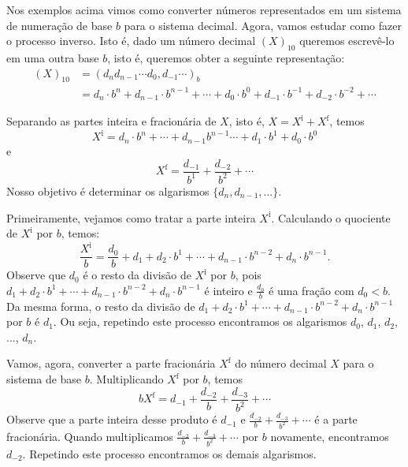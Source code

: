 Nos exemplos acima vimos como converter números representados em um sistema de numeração de base $b$ para o sistema decimal. Agora, vamos estudar como fazer o processo inverso. Isto é, dado um número decimal $(X)_{10}$ queremos escrevê-lo em uma outra base $b$, isto é, queremos obter a seguinte representação:
\begin{equation}
  \begin{split}
    (X)_{10} &= (d_nd_{n-1}\cdots d_0,d_{-1}\cdots)_{b} \\
    &= d_n\cdot b^{n}+d_{n-1}\cdot b^{n-1}+\cdots + d_0\cdot b^0+d_{-1}\cdot b^{-1}+d_{-2}\cdot b^{-2}+\cdots
  \end{split}
\end{equation}

Separando as partes inteira e fracionária de $X$, isto é, $X = X^{\mbox{i}} + X^{\mbox{f}}$, temos
\begin{equation}
X^{\mbox{i}} = d_n\cdot b^{n}+ \cdots+d_{n-1}b^{n-1} \cdots  +d_1\cdot b^1 +d_0\cdot b^0
\end{equation}
e
\begin{equation}
  X^{\mbox{f}} = \frac{d_{-1}}{b^1} + \frac{d_{-2}}{b^{2}} + \cdots
\end{equation}
Nosso objetivo é determinar os algarismos $\{d_n, d_{n-1}, ...\}$.

Primeiramente, vejamos como tratar a parte inteira $X^{\mbox{i}}$. Calculando o quociente de $X^{\mbox{i}}$ por $b$, temos:
\begin{equation}
  \frac{X^{\mbox{i}}}{b}=   \frac{d_0}{b}+d_1+d_2\cdot b^1+\cdots+d_{n-1}\cdot b^{n-2} +d_n\cdot b^{n-1}.
\end{equation}
Observe que $d_0$ é o resto da divisão de $X^{\mbox{i}}$ por $b$, pois $d_1+d_2\cdot b^1+\cdots+d_{n-1}\cdot b^{n-2} +d_n\cdot b^{n-1}$ é inteiro e $\frac{d_0}{b}$ é uma fração com $d_0<b$. Da mesma forma, o resto da divisão de $d_1+d_2\cdot b^1+\cdots+d_{n-1}\cdot b^{n-2} +d_n\cdot b^{n-1}$ por $b$ é $d_1$. Ou seja, repetindo este processo encontramos os algarismos $d_0$, $d_1$, $d_2$, $\ldots$, $d_n$.

Vamos, agora, converter a parte fracionária $X^{\mbox{f}}$ do número decimal $X$ para o sistema de base $b$. Multiplicando $X^{\mbox{f}}$ por $b$, temos
\begin{equation}
  bX^{\mbox{f}}=d_{-1}+\frac{d_{-2}}{b}+\frac{d_{-3}}{b^2}+\cdots
\end{equation}
Observe que a parte inteira desse produto é $d_{-1}$ e $\frac{d_{-2}}{b}+\frac{d_{-3}}{b^2}+\cdots$ é a parte fracionária. Quando multiplicamos $\frac{d_{-2}}{b}+\frac{d_{-3}}{b^2}+\cdots$ por $b$ novamente, encontramos $d_{-2}$. Repetindo este processo encontramos os demais algarismos.



